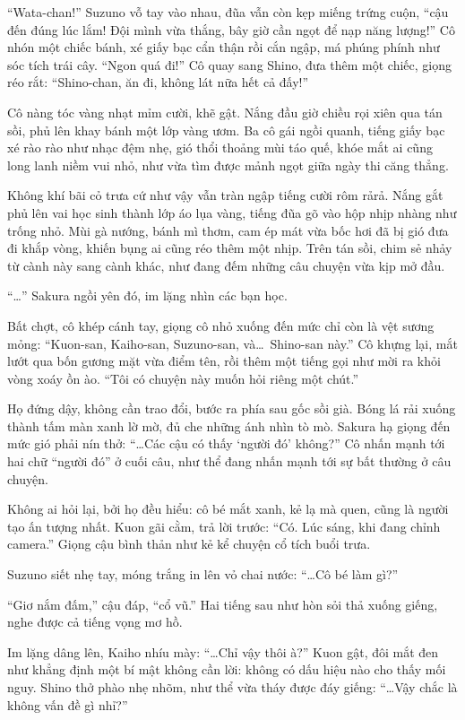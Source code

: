 \documentclass[../main.tex]{subfiles}
\begin{document}
``Wata-chan!'' Suzuno vỗ tay vào nhau, đũa vẫn còn kẹp miếng trứng cuộn, ``cậu đến đúng lúc lắm! Đội mình vừa thắng, bây giờ cần ngọt để nạp năng lượng!'' Cô nhón một chiếc bánh, xé giấy bạc cẩn thận rồi cắn ngập, má phúng phính như sóc tích trái cây. ``Ngon quá đi!'' Cô quay sang Shino, đưa thêm một chiếc, giọng réo rắt: ``Shino-chan, ăn đi, không lát nữa hết cả đấy!''

Cô nàng tóc vàng nhạt mỉm cười, khẽ gật. Nắng đầu giờ chiều rọi xiên qua tán sồi, phủ lên khay bánh một lớp vàng ươm. Ba cô gái ngồi quanh, tiếng giấy bạc xé rào rào như nhạc đệm nhẹ, gió thổi thoảng mùi táo quế, khóe mắt ai cũng long lanh niềm vui nhỏ, như vừa tìm được mảnh ngọt giữa ngày thi căng thẳng.

\il

Không khí bãi cỏ trưa cứ như vậy vẫn tràn ngập tiếng cười rôm rảrả. Nắng gắt phủ lên vai học sinh thành lớp áo lụa vàng, tiếng đũa gõ vào hộp nhịp nhàng như trống nhỏ. Mùi gà nướng, bánh mì thơm, cam ép mát vừa bốc hơi đã bị gió đưa đi khắp vòng, khiến bụng ai cũng réo thêm một nhịp. Trên tán sồi, chim sẻ nhảy từ cành này sang cành khác, như đang đếm những câu chuyện vừa kịp mở đầu.

``\dots'' Sakura ngồi yên đó, im lặng nhìn các bạn học.

Bất chợt, cô khép cánh tay, giọng cô nhỏ xuống đến mức chỉ còn là vệt sương mỏng: ``Kuon-san, Kaiho-san, Suzuno-san, và\dots\ Shino-san này.'' Cô khựng lại, mắt lướt qua bốn gương mặt vừa điểm tên, rồi thêm một tiếng gọi như mời ra khỏi vòng xoáy ồn ào. ``Tôi có chuyện này muốn hỏi riêng một chút.''

Họ đứng dậy, không cần trao đổi, bước ra phía sau gốc sồi già. Bóng lá rải xuống thành tấm màn xanh lờ mờ, đủ che những ánh nhìn tò mò. Sakura hạ giọng đến mức gió phải nín thở: ``\dots Các cậu có thấy `người đó' không?'' Cô nhấn mạnh tới hai chữ ``người đó'' ở cuối câu, như thể đang nhấn mạnh tới sự bất thường ở câu chuyện.

Không ai hỏi lại, bởi họ đều hiểu: cô bé mắt xanh, kẻ lạ mà quen, cũng là người tạo ấn tượng nhất. Kuon gãi cằm, trả lời trước: ``Có. Lúc sáng, khi đang chỉnh camera.'' Giọng cậu bình thản như kẻ kể chuyện cổ tích buổi trưa.

Suzuno siết nhẹ tay, móng trắng in lên vỏ chai nước: ``\dots Cô bé làm gì?''

``Giơ nắm đấm,'' cậu đáp, ``cổ vũ.'' Hai tiếng sau như hòn sỏi thả xuống giếng, nghe được cả tiếng vọng mơ hồ.

Im lặng dâng lên, Kaiho nhíu mày: ``\dots Chỉ vậy thôi à?'' Kuon gật, đôi mắt đen như khẳng định một bí mật không cần lời: không có dấu hiệu nào cho thấy mối nguy. Shino thở phào nhẹ nhõm, như thể vừa tháy được đáy giếng: ``\dots Vậy chắc là không vấn đề gì nhỉ?''
\end{document}

